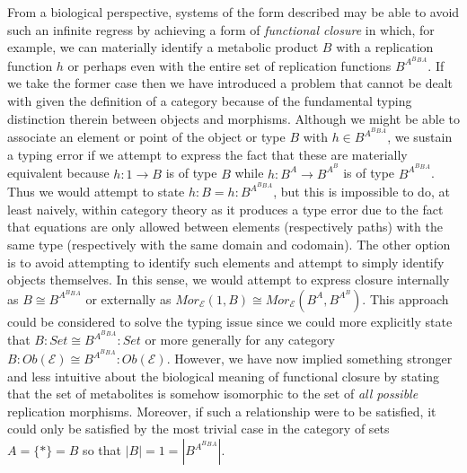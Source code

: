 From a biological perspective, systems of the form described may be able to avoid such an infinite regress by achieving a form of \emph{functional closure} in which, for example, we can materially identify a metabolic product $B$ with a replication function $h$ or perhaps even with the entire set of replication functions $B^{A^B{^B{^A}}}$. If we take the former case then we have introduced a problem that cannot be dealt with given the definition of a category because of the fundamental typing distinction therein between objects and morphisms. Although we might be able to associate an element or point of the object or type $B$ with $h \in B^{A^B{^B{^A}}}$, we sustain a typing error if we attempt to express the fact that these are materially equivalent because $h \colon 1 \rightarrow B$ is of type $B$ while $h \colon B^A \rightarrow B^{A^B}$ is of type $B^{A^B{^B{^A}}}$. Thus we would attempt to state $h:B = h:B^{A^B{^B{^A}}}$, but this is impossible to do, at least naively, within category theory as it produces a type error due to the fact that equations are only allowed between elements (respectively paths) with the same type (respectively with the same domain and codomain). The other option is to avoid attempting to identify such elements and attempt to simply identify objects themselves. In this sense, we would attempt to express closure internally as $B \cong B^{A^B{^B{^A}}}$ or externally as $Mor_{\mathcal{E}}(1,B) \cong Mor_{\mathcal{E}}(B^A,B^{A^B})$. This approach could be considered to solve the typing issue since we could more explicitly state that $B \colon Set \cong B^{A^B{^B{^A}}} \colon Set$ or more generally for any category $B \colon Ob(\mathcal{E}) \cong B^{A^B{^B{^A}}} \colon Ob(\mathcal{E})$. However, we have now implied something stronger and less intuitive about the biological meaning of functional closure by stating that the set of metabolites is somehow isomorphic to the set of \emph{all possible} replication morphisms. Moreover, if such a relationship were to be satisfied, it could only be satisfied by the most trivial case in the category of sets $A = \{*\} = B$ so that $|B|=1=|B^{A^B{^B{^A}}}|$.

